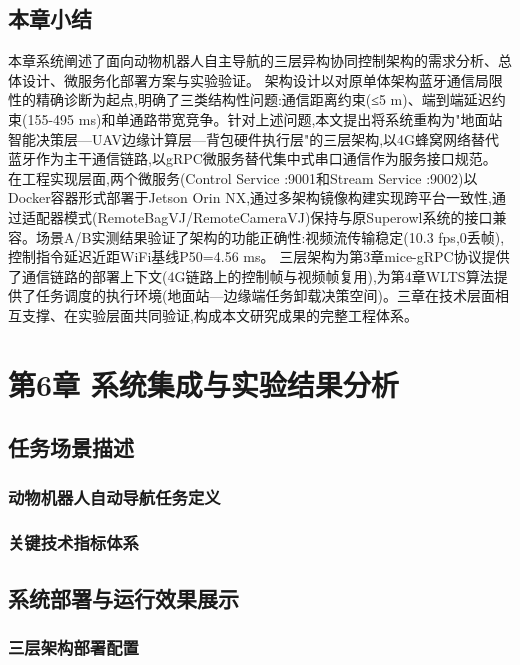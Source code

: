 \section{本章小结}
本章系统阐述了面向动物机器人自主导航的三层异构协同控制架构的需求分析、总体设计、微服务化部署方案与实验验证。
架构设计以对原单体架构蓝牙通信局限性的精确诊断为起点,明确了三类结构性问题:通信距离约束(≤5 m)、端到端延迟约束(155-495 ms)和单通路带宽竞争。针对上述问题,本文提出将系统重构为"地面站智能决策层—UAV边缘计算层—背包硬件执行层"的三层架构,以4G蜂窝网络替代蓝牙作为主干通信链路,以gRPC微服务替代集中式串口通信作为服务接口规范。
在工程实现层面,两个微服务(Control Service :9001和Stream Service :9002)以Docker容器形式部署于Jetson Orin NX,通过多架构镜像构建实现跨平台一致性,通过适配器模式(RemoteBagVJ/RemoteCameraVJ)保持与原Superowl系统的接口兼容。场景A/B实测结果验证了架构的功能正确性:视频流传输稳定(10.3 fps,0丢帧),控制指令延迟近距WiFi基线P50=4.56 ms。
三层架构为第3章mice-gRPC协议提供了通信链路的部署上下文(4G链路上的控制帧与视频帧复用),为第4章WLTS算法提供了任务调度的执行环境(地面站—边缘端任务卸载决策空间)。三章在技术层面相互支撑、在实验层面共同验证,构成本文研究成果的完整工程体系。

\chapter{第6章 系统集成与实验结果分析}

\section{任务场景描述}
\subsection{动物机器人自动导航任务定义}


\subsection{关键技术指标体系}


\section{系统部署与运行效果展示}


\subsection{三层架构部署配置}



